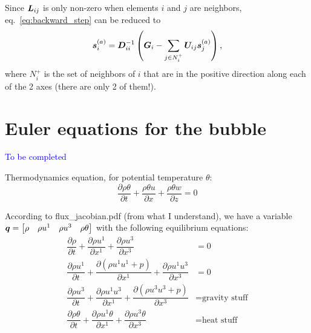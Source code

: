 \documentclass{article}
\newcommand{\todo}[1]{\textcolor{blue}{#1}}
\begin{document}
Since $\bm{L}_{ij}$ is only non-zero when elements $i$ and $j$ are neighbors,
eq.~\ref{eq:backward_step} can be reduced to
\begin{equation}
    \bm{s}^{(a)}_i = \bm{D}_{ii}^{-1} \left(
        \bm{G}_i - \sum_{j\in N_i^+} \bm{U}_{ij} \bm{s}^{(a)}_j \right)
    \text{,}
\end{equation}
where $N_i^+$ is the set of neighbors of $i$ that are in the positive direction along each of the 2 axes (there are only 2 of them!).

\appendix

\section{Euler equations for the bubble}

\todo{To be completed}

Thermodynamics equation, for potential temperature $\theta$:
\begin{equation}
    \dfrac{ \partial \rho \theta}{\partial t } + \dfrac{ \rho \theta u }{\partial x } +  \dfrac{ \rho \theta w }{\partial z } = 0
\end{equation}


According to flux\_jacobian.pdf (from what I understand), we have a variable
$\bm{q} = \left[\begin{matrix}
    \rho & \rho u^1 & \rho u^3 & \rho \theta
\end{matrix}\right]$
with the following equilibrium equations:
\begin{align}
    \dfrac{\partial \rho}{\partial t} + \dfrac{\partial \rho u^1}{\partial x^1} +
        \dfrac{\partial \rho u^3}{\partial x^3} &= 0 \\
    \dfrac{\partial \rho u^1}{\partial t} + \dfrac{\partial(\rho u^1u^1 + p)}{\partial x^1}
        + \dfrac{\partial \rho u^1u^3}{\partial x^3} &= 0 \\
    \dfrac{\partial \rho u^3}{\partial t} + \dfrac{\partial\rho u^1u^3}{\partial x^1}
        + \dfrac{\partial (\rho u^3u^3 + p)}{\partial x^3} &= \text{gravity stuff} \\
    \dfrac{\partial \rho \theta}{\partial t} +
        \dfrac{\partial \rho u^1 \theta}{\partial x^1} +
        \dfrac{\partial \rho u^3 \theta}{\partial x^3} &= \text{heat stuff}
\end{align}
\end{document}

